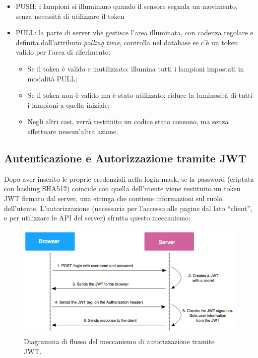 \documentclass[a4paper, 11pt]{article}
\begin{document}
\begin{itemize}
    \item PUSH: i lampioni si illuminano quando il sensore segnala un movimento, senza necessità di utilizzare il token
    \item PULL: la parte di server vhe gestisce l'area illuminata, con cadenza regolare e definita dall'attributo \textit{polling time}, controlla nel database se c'è un token valido per l'area di riferimento:
    \begin{itemize}
        \item Se il token è valido e inutilizzato: illumina tutti i lampioni impostati in modalità PULL;
        \item Se il token non è valido ma è stato utilizzato: riduce la luminosità di tutti i lampioni a quella iniziale;
        \item Negli altri casi, verrà restituito un codice stato consono, ma senza effettuare nessun'altra azione.
    \end{itemize}
\end{itemize}

\subsection{Autenticazione e Autorizzazione tramite JWT}
Dopo aver inserito le proprie credenziali nella login mask, se la password (criptata con hashing SHA512) coincide con quella dell'utente viene restituito un token JWT firmato dal server, una stringa che contiene informazioni sul ruolo dell'utente. L'autorizzazione (necessaria per l'accesso alle pagine dal lato “client”, e per utilizzare le API del server) sfrutta questo meccanismo:
\begin{figure}[H]
    \centering
    \includegraphics[width=\textwidth]{auth}
    \caption{Diagramma di flusso del meccanismo di autorizzazione tramite JWT.}
\end{figure}
\end{document}
